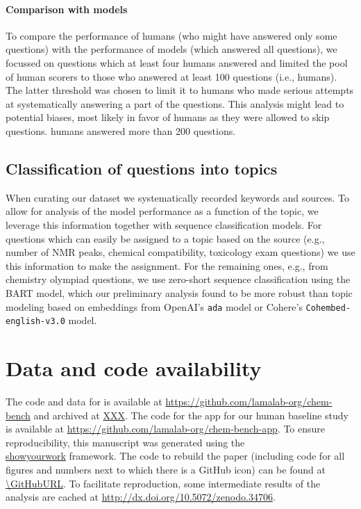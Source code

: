 \documentclass[11pt, oneside]{article}
\begin{document}
\begin{refsection}
\paragraph{Comparison with models}
To compare the performance of humans (who might have answered only some questions) with the performance of models (which answered all questions), we focussed on questions which at least four humans answered and limited the pool of human scorers to those who answered at least 100 questions (i.e.,  humans). 
The latter threshold was chosen to limit it to humans who made serious attempts at systematically answering a part of the questions. 
This analysis might lead to potential biases, most likely in favor of humans as they were allowed to skip questions.  humans answered more than 200 questions.


\subsection{Classification of questions into topics}\label{sec:meth-topic} When curating our dataset we systematically recorded keywords and sources.
To allow for analysis of the model performance as a function of the topic, we leverage this information together with sequence classification models.
For questions which can easily be assigned to a topic based on the source (e.g., number of NMR peaks, chemical compatibility, toxicology exam questions) we use this information to make the assignment.
For the remaining ones, e.g., from chemistry olympiad questions, we use zero-short sequence classification\autocite{zeroshotsequence} using the BART model\autocite{bart, FacebookBART}, which our preliminary analysis found to be more robust than topic modeling based on embeddings from OpenAI's \texttt{ada} model or Cohere's \texttt{Cohembed-english-v3.0} model.


\section*{Data and code availability}
The code and data for \chembench is available at \url{https://github.com/lamalab-org/chem-bench} and archived at \url{XXX}.
The code for the app for our human baseline study is available at \url{https://github.com/lamalab-org/chem-bench-app}. 
To ensure reproducibility, this manuscript was generated using the \href{https://show-your.work/en/latest/}{\\showyourwork} framework.\autocite{Luger2021}
The code to rebuild the paper (including code for all figures and numbers next to which there is a GitHub icon) can be found at \url{\GitHubURL}. 
To facilitate reproduction, some intermediate results of the analysis are cached at \url{http://dx.doi.org/10.5072/zenodo.34706}.


\end{refsection}
\end{document}
